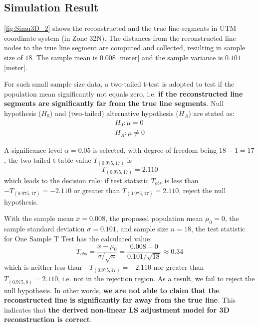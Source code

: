 \clearpage

\subsection{Simulation Result}
\label{subsec:simuresult}

\cref{fig:Simu3D_2} shows the reconstructed and the true line segments in UTM coordinate system (in Zone 32N). The distances from the reconstructed line nodes to the true line segment are computed and collected, resulting in sample size of $18$. The sample mean is $0.008$ [meter] and the sample variance is $0.101$ [meter]. %

For such small sample size data, a two-tailed t-test is adopted to test if the population mean significantly not equals zero, i.e. \textbf{if the reconstructed line segments are significantly far from the true line segments}. Null hypothesis ($H_0$) and (two-tailed) alternative hypothesis ($H_A$) are stated as:
\begin{equation*}
\begin{split}
H_0: \mu=0\\
H_A: \mu\neq0
\end{split}
\end{equation*}

A significance level $\alpha=0.05$ is selected, with degree of freedom being $18-1=17$, the two-tailed t-table value $T_{(0.975,17)}$ is
\begin{equation*}
T_{(0.975,17)}=2.110
\end{equation*}
which leads to the decision rule: if test statistic $T_{obs}$ is less than $-T_{(0.975,17)}=-2.110$ or greater than $T_{(0.975,17)}=2.110$, reject the null hypothesis.

With the sample mean $\overline{x}=0.008$,
the proposed population mean $\mu_0=0$,
the sample standard deviation $\sigma=0.101$,
and sample size $n=18$, the test statistic for One Sample T Test has the calculated value:
\begin{equation*}
T_{obs} = \frac{\overline{x}-\mu_0}{\sigma/\sqrt{n}}=\frac{0.008-0}{0.101/\sqrt{18}}\approx0.34
\end{equation*}
which is neither less than $-T_{(0.975,17)}=-2.110$ nor greater than $T_{(0.975,8)}=2.110$, i.e. not in the rejection region. As a result, we fail to reject the null hypothesis. In other words, \textbf{we are not able to claim that the reconstructed line is significantly far away from the true line}. This indicates that \textbf{the derived non-linear LS adjustment model for 3D reconstruction is correct}.

